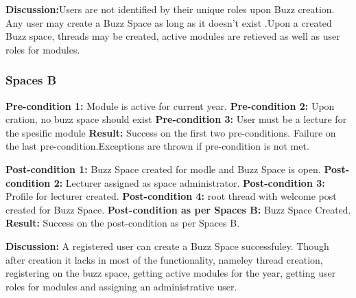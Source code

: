 \textbf{Discussion:}Users are not identified by their unique roles upon Buzz creation. Any user may create a Buzz Space as long as it doesn't exist .Upon a created Buzz space, threads may be created, active modules are retieved as well as user roles for modules. 

\subsubsection{Spaces B}
\textbf{Pre-condition 1:}  Module is active for current year.  \newline
\textbf{Pre-condition 2:}  Upon cration, no buzz space should exist \newline
\textbf{Pre-condition 3:}  User must be a lecture for the spesific module \newline
\textbf{Result:} Success on the first two  pre-conditions. Failure on the last pre-condition.Exceptions are thrown if pre-condition is not met. \newline

\textbf{Post-condition 1:} Buzz Space created for modle and Buzz Space is open.\newline
\textbf{Post-condition 2:} Lecturer assigned as space administrator.\newline
\textbf{Post-condition 3:} Profile for lecturer created.\newline
\textbf{Post-condition 4:} root thread with welcome post created for Buzz Space.\newline
\textbf{Post-condition as per Spaces B:} Buzz Space Created.\newline
\textbf{Result:} Success on the post-condition as per Spaces B. \newline
  
\textbf{Discussion:} A registered user can create a Buzz Space successfuley. Though after creation it lacks in most of the functionality, nameley thread creation, registering on the buzz space, getting active modules for the year, getting user roles for modules and assigning an administrative user.

